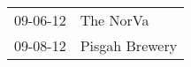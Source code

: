 \begin{supertabular}{p{0.07\textwidth}p{0.23\textwidth}}
 09-06-12 &       The NorVa \\
 09-08-12 &  Pisgah Brewery \\
\end{supertabular}
